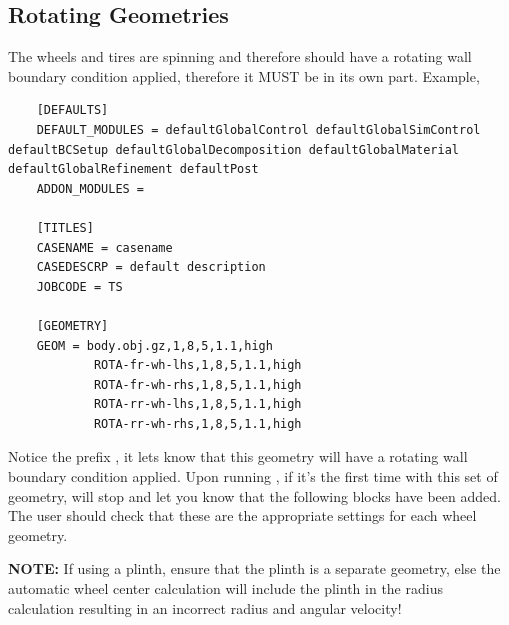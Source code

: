 \subsection{Rotating Geometries}
The wheels and tires are spinning and therefore should have a rotating wall boundary condition applied, therefore it MUST be in its own part. Example,
\begin{lstlisting}
    [DEFAULTS]
    DEFAULT_MODULES = defaultGlobalControl defaultGlobalSimControl defaultBCSetup defaultGlobalDecomposition defaultGlobalMaterial defaultGlobalRefinement defaultPost
    ADDON_MODULES =

    [TITLES]
    CASENAME = casename
    CASEDESCRP = default description
    JOBCODE = TS

    [GEOMETRY]
    GEOM = body.obj.gz,1,8,5,1.1,high
            ROTA-fr-wh-lhs,1,8,5,1.1,high
            ROTA-fr-wh-rhs,1,8,5,1.1,high
            ROTA-rr-wh-lhs,1,8,5,1.1,high
            ROTA-rr-wh-rhs,1,8,5,1.1,high
\end{lstlisting}
Notice the prefix , it lets  know that this geometry will have a rotating wall boundary condition applied. Upon running , if it's the first time with this set of geometry,  will stop and let you know that the following blocks have been added. The user should check that these are the appropriate settings for each wheel geometry.

\textbf{NOTE:} If using a plinth, ensure that the plinth is a separate geometry, else the automatic wheel center calculation will include the plinth in the radius calculation resulting in an incorrect radius and angular velocity!

